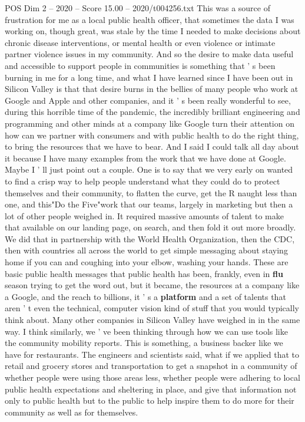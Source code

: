 \begin{textsample}{POS Dim 2 – 2020 – Score 15.00 – 2020/t004256.txt}
This was a source of frustration for me as a local public health officer, that sometimes the data I was working on, though great, was stale by the time I needed to make decisions about chronic disease interventions, or mental health or even violence or intimate partner violence issues in my community.
And so the desire to make data useful and accessible to support people in communities is something that ' s been burning in me for a long time, and what I have learned since I have been out in Silicon Valley is that that desire burns in the bellies of many people who work at Google and Apple and other companies, and it ' s been really wonderful to see, during this horrible time of the pandemic, the incredibly brilliant engineering and programming and other minds at a company like Google turn their attention on how can we partner with consumers and with public health to do the right thing, to bring the resources that we have to bear.
And I said I could talk all day about it because I have many examples from the work that we have done at Google.
Maybe I ' ll just point out a couple.
One is to say that we very early on wanted to find a crisp way to help people understand what they could do to protect themselves and their community, to flatten the curve, get the R naught less than one, and this"Do the Five"work that our teams, largely in marketing but then a lot of other people weighed in.
It required massive amounts of talent to make that available on our landing page, on search, and then fold it out more broadly.
We did that in partnership with the World Health Organization, then the CDC, then with countries all across the world to get simple messaging about staying home if you can and coughing into your elbow, washing your hands.
These are basic public health messages that public health has been, frankly, even in \textbf{flu} season trying to get the word out, but it became, the resources at a company like a Google, and the reach to billions, it ' s a \textbf{platform} and a set of talents that aren ' t even the technical, computer vision kind of stuff that you would typically think about.
Many other companies in Silicon Valley have weighed in in the same way.
I think similarly, we ' ve been thinking through how we can use tools like the community mobility reports.
This is something, a business backer like we have for restaurants.
The engineers and scientists said, what if we applied that to retail and grocery stores and transportation to get a snapshot in a community of whether people were using those areas less, whether people were adhering to local public health expectations and sheltering in place, and give that information not only to public health but to the public to help inspire them to do more for their community as well as for themselves.

\end{textsample}
